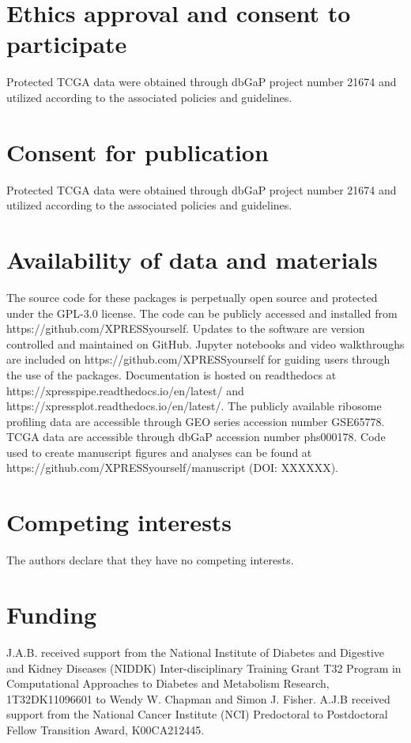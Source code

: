\documentclass[10pt, oneside]{article}
\begin{document}
\section*{Ethics approval and consent to participate}
Protected TCGA data were obtained through dbGaP project number 21674 and utilized according to the associated policies and guidelines.

\section*{Consent for publication}
Protected TCGA data were obtained through dbGaP project number 21674 and utilized according to the associated policies and guidelines.

\section*{Availability of data and materials}
The source code for these packages is perpetually open source and protected under the GPL-3.0 license. The code can be publicly accessed and installed from https://github.com/XPRESSyourself. Updates to the software are version controlled and maintained on GitHub. Jupyter notebooks and video walkthroughs are included on https://github.com/XPRESSyourself for guiding users through the use of the packages. Documentation is hosted on readthedocs \cite{readthedocs} at https://xpresspipe.readthedocs.io/en/latest/ and https://xpressplot.readthedocs.io/en/latest/. The publicly available ribosome profiling data are accessible through GEO series accession number GSE65778. TCGA data are accessible through dbGaP accession number phs000178. Code used to create manuscript figures and analyses can be found at https://github.com/XPRESSyourself/manuscript (DOI: XXXXXX).

\section*{Competing interests}
The authors declare that they have no competing interests.

\section*{Funding}
J.A.B. received support from the National Institute of Diabetes and Digestive and Kidney Diseases (NIDDK) Inter-disciplinary Training Grant T32 Program in Computational Approaches to Diabetes and Metabolism Research, 1T32DK11096601 to Wendy W. Chapman and Simon J. Fisher. A.J.B received support from the National Cancer Institute (NCI) Predoctoral to Postdoctoral Fellow Transition Award, K00CA212445.
\end{document}
